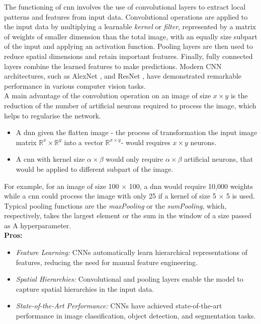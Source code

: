 The functioning of \gls{cnn} involves the use of convolutional layers to extract local patterns and features from input data. Convolutional operations are applied to the input data by multiplying a learnable \textit{kernel} or \textit{filter}, represented by a matrix of weights of smaller dimension than the total image, with an equally size subpart of the input and applying an activation function. Pooling layers are then used to reduce spatial dimensions and retain important features. Finally, fully connected layers combine the learned features to make predictions. Modern CNN architectures, such as AlexNet \cite{NIPS2012_c399862d}, and ResNet \cite{resNetPaper}, have demonstrated remarkable performance in various computer vision tasks.\\
A main advantage of the convolution operation on an image of size $x \times y$ is the reduction of the number of artificial neurons required to process the image, which helps to regularise the network.
\begin{itemize}
    \item A \gls{dnn} given the flatten image - the process of transformation the input image matrix $\mathbb{R}^{x} \times \mathbb{R}^{y}$ into a vector $\mathbb{R}^{x \times y}$- would requires $x \times y$ neurons. 
    \item A \gls{cnn} with kernel size $\alpha \times \beta$ would only require $\alpha \times \beta$ artificial neurons, that would be applied to different subpart of the image.
\end{itemize}
For example, for an image of size 100 $\times$ 100, a \gls{dnn} would require 10,000 weights while a \gls{cnn} could process the image with only 25 if a kernel of size 5 $\times$ 5 is used. Typical pooling functions are the \textit{maxPooling} or the \textit{sumPooling}, which, respectively, takes the largest element or the sum in the window of a size passed as A hyperparameter.\\
\textbf{Pros:}
\begin{itemize}
    \item \textit{Feature Learning:} CNNs automatically learn hierarchical representations of features, reducing the need for manual feature engineering.
    \item \textit{Spatial Hierarchies:} Convolutional and pooling layers enable the model to capture spatial hierarchies in the input data.
    \item \textit{State-of-the-Art Performance:} CNNs have achieved state-of-the-art performance in image classification, object detection, and segmentation tasks.
\end{itemize}

